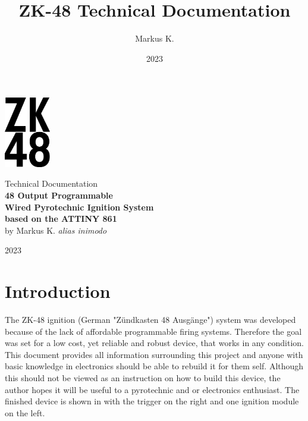 

\title{ZK-48 Technical Documentation}
\author{Markus K.}
\date{2023}



\begin{titlepage}
\begin{center}
\vspace*{1cm}
\includegraphics[width=2cm]{./Figures/zk_48_logo.png}
\vspace*{1cm}

\Huge {Technical Documentation\\} 
\vspace*{1cm}
\Huge{\textbf{48 Output Programmable\\ Wired Pyrotechnic Ignition System\\ based on the ATTINY 861\\}}
\vspace*{0.5cm} 
\Large{by Markus K. \textit{alias inimodo}}
\vspace*{0.5cm}

\Large{2023}
\end{center}
\end{titlepage}

\pagebreak 

\tableofcontents

\pagebreak

\section{Introduction}
The ZK-48 ignition (German "Zündkasten 48 Ausgänge") system was developed because of the lack of affordable  programmable firing systems. Therefore the goal was set for a low cost, yet reliable and robust device, that works in any condition. This document provides all information surrounding this project and anyone with basic knowledge in electronics should be able to rebuild it for them self. Although this should not be viewed as an instruction on how to build this device, the author hopes it will be useful to a pyrotechnic and or electronics enthusiast. The finished device is shown in  with the trigger on the right and one ignition module on the left.

